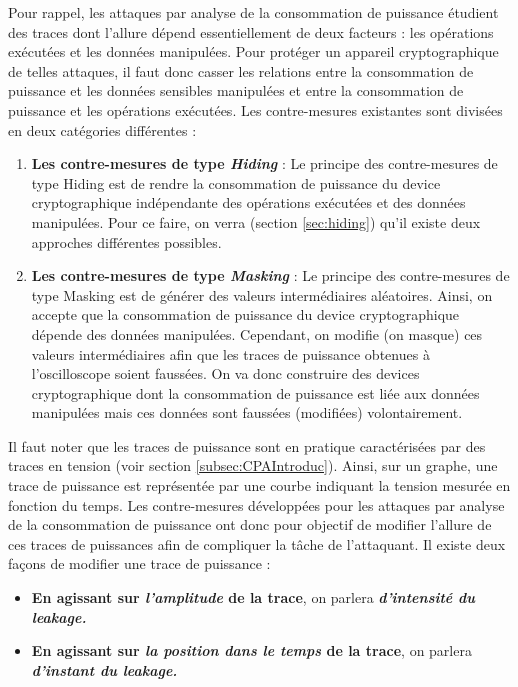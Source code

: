 \documentclass[10pt, oneside, a4paper]{article}
\begin{document}
Pour rappel, les attaques par analyse de la consommation de puissance étudient des traces dont l'allure dépend essentiellement de deux facteurs : les opérations exécutées et les données manipulées. Pour protéger un appareil cryptographique de telles attaques, il faut donc casser les relations entre la consommation de puissance et les données sensibles manipulées et entre la consommation de puissance et les opérations exécutées. Les contre-mesures existantes sont divisées en deux catégories différentes : 
\begin{enumerate}
\item \textbf{Les contre-mesures de type \textit{Hiding}} : Le principe des contre-mesures de type Hiding est de rendre la consommation de puissance du device cryptographique indépendante des opérations exécutées et des données manipulées. Pour ce faire, on verra (section \ref{sec:hiding}) qu'il existe deux approches différentes possibles.
\item \textbf{Les contre-mesures de type \textit{Masking}} : Le principe des contre-mesures de type Masking est de générer des valeurs intermédiaires aléatoires. Ainsi, on accepte que la consommation de puissance du device cryptographique dépende des données manipulées. Cependant, on modifie (on masque) ces valeurs intermédiaires afin que les traces de puissance obtenues à l'oscilloscope soient faussées. On va donc construire des devices cryptographique dont la consommation de puissance est liée aux données manipulées mais ces données sont faussées (modifiées) volontairement. \\
\end{enumerate}

\vspace{-0.2 cm}Il faut noter que les traces de puissance sont en pratique caractérisées par des traces en tension (voir section \ref{subsec:CPAIntroduc}). Ainsi, sur un graphe, une trace de puissance est représentée par une courbe indiquant la tension mesurée en fonction du temps. Les contre-mesures développées pour les attaques par analyse de la consommation de puissance ont donc pour objectif de modifier l'allure de ces traces de puissances afin de compliquer la tâche de l'attaquant. Il existe deux façons de modifier une trace de puissance : 
\begin{itemize}
\item \textbf{En agissant sur \textit{l'amplitude} de la trace}, on parlera \textbf{\textit{d'intensité du leakage.}}
\item \textbf{En agissant sur \textit{la position dans le temps} de la trace}, on parlera \textbf{\textit{d'instant du leakage.}} \\
\end{itemize}
\end{document}
